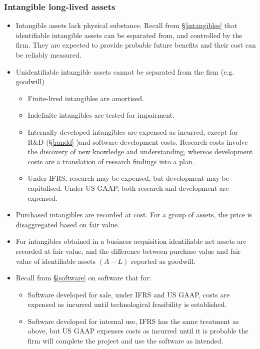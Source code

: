 \documentclass[../notes_compiled.tex]{subfiles}
\begin{document}
\subsubsection{Intangible long-lived assets}
\begin{itemize}
\item Intangible assets lack physical substance. Recall from \S\ref{intangibles} that identifiable intangible assets can be separated from, and controlled by the firm. They are expected to provide probable future benefits and their cost can be reliably measured. 
\item Unidentifiable intangible assets cannot be separated from the firm (e.g. goodwill)
\begin{itemize}
\item Finite-lived intangibles are amortised.
\item Indefinite intangibles are tested for impairment.
\item Internally developed intangibles are expensed as incurred, except for R\&D (\S\ref{randd} )and software development costs. Research costs involve the discovery of new knowledge and understanding, whereas development costs are a translation of research findings into a plan.
\item[] Under IFRS, research may be expensed, but development may be capitalised. Under US GAAP, both research and development are expensed.
\end{itemize}
\item Purchased intangibles are recorded at cost. For a group of assets, the price is disaggregated based on fair value.
\item For intangibles obtained in a business acquisition identifiable net assets are recorded at fair value, and the difference between purchase value and fair value of identifiable assets $(A-L)$ reported as goodwill.
\item Recall from \S\ref{software} on software that for:
\begin{itemize}
\item Software developed for sale, under IFRS and US GAAP, costs are expensed as incurred until technological feasibility is established.
\item Software developed for internal use, IFRS has the same treatment as above, but US GAAP expenses costs as incurred until it is probable the firm will complete the project and use the software as intended.
\end{itemize}
\end{itemize}
\end{document}
